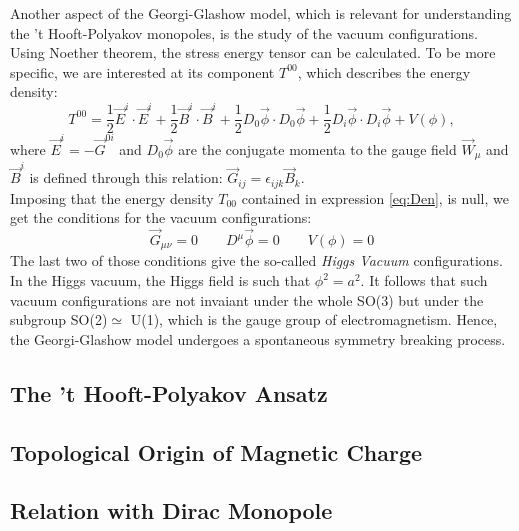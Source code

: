 Another aspect of the Georgi-Glashow model, which is relevant for understanding the 't Hooft-Polyakov monopoles, is the study of the vacuum configurations.\\
Using Noether theorem, the stress energy tensor can be calculated. To be more specific, we are interested at its component $T^{00}$, which describes the energy density: 
\begin{equation}
T^{00} = \frac{1}{2} \Vec{E}^i \cdot  \Vec{E}^i + \frac{1}{2} \Vec{B}^i \cdot \Vec{B}^i +\frac{1}{2} D_0 \Vec{\phi} \cdot D_0 \Vec{\phi} +\frac{1}{2} D_i \Vec{\phi} \cdot  D_i \Vec{\phi} + V(\phi),
\label{eq:Den}
\end{equation}
where $\Vec{E}^i = - \Vec{G}^{0i}$ and $D_0 \Vec{\phi}$ are the conjugate momenta to the gauge field $\Vec{W}_{\mu}$ and $\Vec{B}^i$ is defined through this relation: $ \Vec{G}_{ij} = \epsilon_{ijk} \Vec{B}_k$.\\
Imposing that the energy density $T_{00}$ contained in expression \ref{eq:Den}, is null, we get the conditions for the vacuum configurations: 
\begin{equation}
\Vec{G}_{\mu \nu} = 0 \qquad D^{\mu} \Vec{\phi}  = 0 \qquad V(\phi)=0
\end{equation}
The last two of those conditions give the so-called \textit{Higgs Vacuum} configurations. 
In the Higgs vacuum, the Higgs field is such that $\phi^2 = a^2$. It follows that such vacuum configurations are not invaiant under the whole SO(3) but under the subgroup SO(2)$\simeq$ U(1), which is the gauge group of electromagnetism. Hence, the Georgi-Glashow model undergoes a spontaneous symmetry breaking process.





\subsection{The 't Hooft-Polyakov Ansatz}
\subsection{Topological Origin of Magnetic Charge}
\subsection{Relation with Dirac Monopole}